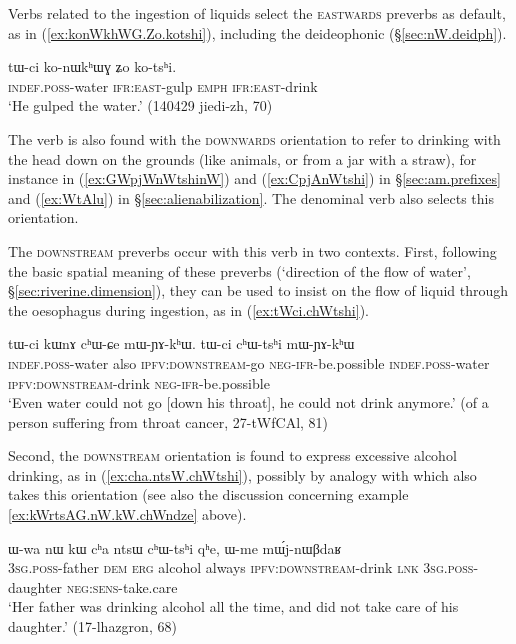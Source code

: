 Verbs related to the ingestion of liquids select the \textsc{eastwards} preverbs as default, as in (\ref{ex:konWkhWG.Zo.kotshi}), including the deideophonic  (§\ref{sec:nW.deidph}).

\begin{exe}
\ex \label{ex:konWkhWG.Zo.kotshi}
\gll tɯ-ci ko-nɯkʰɯɣ ʑo ko-tsʰi. \\
\textsc{indef}.\textsc{poss}-water \textsc{ifr}:\textsc{east}-gulp \textsc{emph} \textsc{ifr}:\textsc{east}-drink \\
\glt `He gulped the water.' (140429 jiedi-zh, 70)
\end{exe}

The verb  is also found with the \textsc{downwards} orientation to refer to drinking with the head down on the grounds (like animals, or from a jar with a straw), for instance in (\ref{ex:GWpjWnWtshinW}) and (\ref{ex:CpjAnWtshi}) in §\ref{sec:am.prefixes} and (\ref{ex:WtAlu}) in §\ref{sec:alienabilization}. The denominal verb  also selects this orientation.

The \textsc{downstream} preverbs occur with this verb in two contexts. First,  following the basic spatial meaning of these preverbs (`direction of the flow of water', §\ref{sec:riverine.dimension}), they can be used to insist on the flow of liquid through the oesophagus during ingestion, as in (\ref{ex:tWci.chWtshi}). 

\begin{exe}
\ex \label{ex:tWci.chWtshi}
\gll tɯ-ci kɯnɤ cʰɯ-ɕe mɯ-ɲɤ-kʰɯ. tɯ-ci cʰɯ-tsʰi mɯ-ɲɤ-kʰɯ \\
\textsc{indef}.\textsc{poss}-water also \textsc{ipfv}:\textsc{downstream}-go \textsc{neg}-\textsc{ifr}-be.possible \textsc{indef}.\textsc{poss}-water \textsc{ipfv}:\textsc{downstream}-drink \textsc{neg}-\textsc{ifr}-be.possible \\
\glt `Even water could not go [down his throat], he could not drink anymore.' (of a person suffering from throat cancer, 27-tWfCAl, 81)
\end{exe}

Second, the \textsc{downstream} orientation is found to express excessive alcohol drinking, as in (\ref{ex:cha.ntsW.chWtshi}), possibly by analogy with  which also takes this orientation (see also the discussion concerning example \ref{ex:kWrtsAG.nW.kW.chWndze} above).

\begin{exe}
\ex \label{ex:cha.ntsW.chWtshi}
\gll  ɯ-wa nɯ kɯ cʰa ntsɯ cʰɯ-tsʰi qʰe, ɯ-me mɯ́j-nɯβdaʁ \\
\textsc{3sg}.\textsc{poss}-father \textsc{dem} \textsc{erg} alcohol always \textsc{ipfv}:\textsc{downstream}-drink \textsc{lnk} \textsc{3sg}.\textsc{poss}-daughter \textsc{neg}:\textsc{sens}-take.care \\
\glt `Her father was drinking alcohol all the time, and did not take care of his daughter.' (17-lhazgron, 68)
\end{exe}

